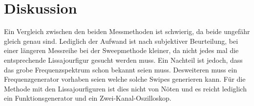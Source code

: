 \section{Diskussion}
\label{sec:Diskussion}
Ein Vergleich zwischen den beiden Messmethoden ist schwierig, da beide ungefähr gleich genau sind. Lediglich der Aufwand ist nach subjektiver Beurteilung, bei einer längeren Messreihe bei der Sweepmethode kleiner, da nicht jedes mal die entsprechende Lissajourfigur gesucht werden muss. Ein Nachteil ist jedoch, dass das grobe Frequenzspektrum schon bekannt seien muss. Desweiteren muss ein Frequenzgenerator vorhaben seien welche solche Swipes generieren kann. Für die Methode mit den Lissajourfiguren ist dies nicht von Nöten und es reicht lediglich ein Funktionsgenerator und ein Zwei-Kanal-Oszilloskop.

